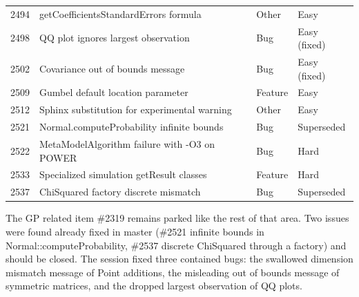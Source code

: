 \documentclass[a4paper,11pt]{article}
\begin{document}
\begin{longtable}{rp{7.6cm}ll}
2494 & getCoefficientsStandardErrors formula & Other & Easy \\
2498 & QQ plot ignores largest observation & Bug & Easy (fixed) \\
2502 & Covariance out of bounds message & Bug & Easy (fixed) \\
2509 & Gumbel default location parameter & Feature & Easy \\
2512 & Sphinx substitution for experimental warning & Other & Easy \\
2521 & Normal.computeProbability infinite bounds & Bug & Superseded \\
2522 & MetaModelAlgorithm failure with -O3 on POWER & Bug & Hard \\
2533 & Specialized simulation getResult classes & Feature & Hard \\
2537 & ChiSquared factory discrete mismatch & Bug & Superseded \\
\bottomrule
\end{longtable}
\normalsize

The GP related item \#2319 remains parked like the rest of that area.
Two issues were found already fixed in master (\#2521 infinite bounds in
Normal::computeProbability, \#2537 discrete ChiSquared through a
factory) and should be closed. The session fixed three contained bugs:
the swallowed dimension mismatch message of Point additions, the
misleading out of bounds message of symmetric matrices, and the dropped
largest observation of QQ plots.
\end{document}
